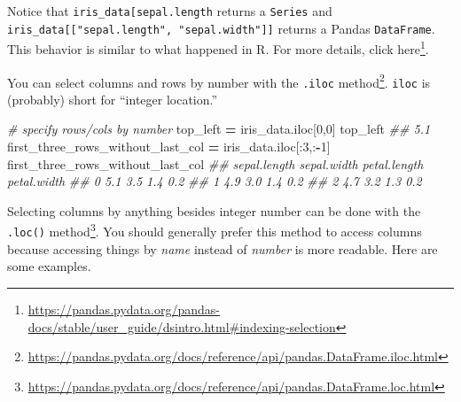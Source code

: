 \documentclass[
  12pt,
  krantz2]{krantz}
\makeatletter
\newenvironment{Shaded}{\begin{snugshade}}{\end{snugshade}}
\newcommand{\CommentTok}[1]{\textcolor[rgb]{0.37,0.37,0.37}{\textit{#1}}}
\newcommand{\DecValTok}[1]{\textcolor[rgb]{0.06,0.06,0.06}{#1}}
\newcommand{\NormalTok}[1]{#1}
\newcommand{\OperatorTok}[1]{\textcolor[rgb]{0.43,0.43,0.43}{\textbf{#1}}}
\renewcommand{\href}[2]{#2\footnote{\url{#1}}}
\newenvironment{kframe}{%
\medskip{}
\setlength{\fboxsep}{.8em}
 \def\at@end@of@kframe{}%
 \ifinner\ifhmode%
  \def\at@end@of@kframe{\end{minipage}}%
  \begin{minipage}{\columnwidth}%
 \fi\fi%
 \def\FrameCommand##1{\hskip\@totalleftmargin \hskip-\fboxsep
 \colorbox{shadecolor}{##1}\hskip-\fboxsep
     \hskip-\linewidth \hskip-\@totalleftmargin \hskip\columnwidth}%
 \MakeFramed {\advance\hsize-\width
   \@totalleftmargin\z@ \linewidth\hsize
   \@setminipage}}%
 {\par\unskip\endMakeFramed%
 \at@end@of@kframe}
\renewenvironment{Shaded}{\begin{kframe}}{\end{kframe}}
\newenvironment{rmd-details}{\begin{lrbox}{\rmdbox}
  \minipage[c]{\dimexpr \textwidth-2\fboxrule-\wd\bulb-\columnsep}
    \vspace*{\columnsep}}%
{\vspace*{\columnsep}\endminipage\end{lrbox}%
  {\par\color{green}\fboxsep=0pt
    \fbox{\usebox\bulb\usebox\rmdbox\hspace{\columnsep}}\par}}
\makeatother
\begin{document}
\begin{rmd-details}
Notice that \texttt{iris\_data{[}\textquotesingle{}sepal.length\textquotesingle{}{]}} returns a \texttt{Series} and \texttt{iris\_data{[}{[}"sepal.length",\ "sepal.width"{]}{]}} returns a Pandas \texttt{DataFrame}. This behavior is similar to what happened in R. For more details, click \href{https://pandas.pydata.org/pandas-docs/stable/user_guide/dsintro.html\#indexing-selection}{here}.

\end{rmd-details}

You can select columns and rows by number with the \href{https://pandas.pydata.org/docs/reference/api/pandas.DataFrame.iloc.html}{\texttt{.iloc} method}. \texttt{iloc} is (probably) short for ``integer location.''

\begin{Shaded}
\begin{Highlighting}[]
\CommentTok{\# specify rows/cols by number}
\NormalTok{top\_left }\OperatorTok{=}\NormalTok{ iris\_data.iloc[}\DecValTok{0}\NormalTok{,}\DecValTok{0}\NormalTok{]}
\NormalTok{top\_left}
\CommentTok{\#\# 5.1}
\NormalTok{first\_three\_rows\_without\_last\_col }\OperatorTok{=}\NormalTok{ iris\_data.iloc[:}\DecValTok{3}\NormalTok{,:}\OperatorTok{{-}}\DecValTok{1}\NormalTok{]}
\NormalTok{first\_three\_rows\_without\_last\_col}
\CommentTok{\#\#    sepal.length  sepal.width  petal.length  petal.width}
\CommentTok{\#\# 0           5.1          3.5           1.4          0.2}
\CommentTok{\#\# 1           4.9          3.0           1.4          0.2}
\CommentTok{\#\# 2           4.7          3.2           1.3          0.2}
\end{Highlighting}
\end{Shaded}

Selecting columns by anything besides integer number can be done with the \href{https://pandas.pydata.org/docs/reference/api/pandas.DataFrame.loc.html}{\texttt{.loc()} method}. You should generally prefer this method to access columns because accessing things by \emph{name} instead of \emph{number} is more readable. Here are some examples.
\end{document}
